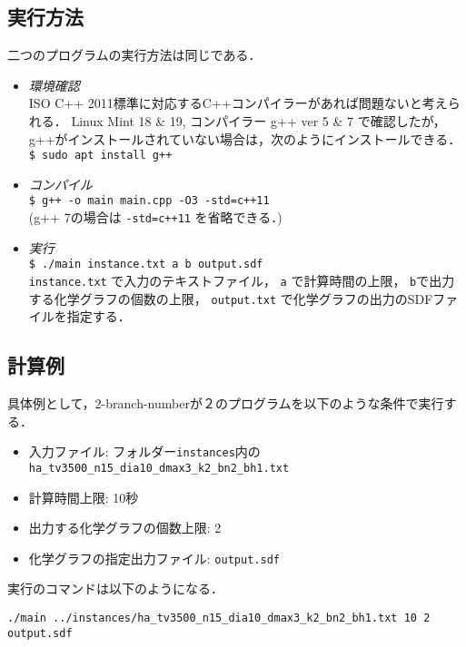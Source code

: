 \documentclass[11pt,titlepage,dvipdfmx,twoside]{jarticle}
\begin{document}
\subsection{実行方法}
\label{sec:compile}
二つのプログラムの実行方法は同じである．
\begin{itemize}
	\item {\em 環境確認}\\
		ISO C++ 2011標準に対応するC++コンパイラーがあれば問題ないと考えられる．
		Linux Mint 18 \& 19, コンパイラー g++ ver 5 \& 7 で確認したが，g++がインストールされていない場合は，次のようにインストールできる．\\
		\verb|$ sudo apt install g++|
	\item {\em コンパイル}\\
		\verb|$ g++ -o main main.cpp -O3 -std=c++11|\\
		(g++ 7の場合は \verb|-std=c++11| を省略できる．)
	\item {\em 実行}\\
		\verb|$ ./main instance.txt a b output.sdf|\\
		\verb|instance.txt| で入力のテキストファイル，
		\verb|a| で計算時間の上限，
		\verb|b|で出力する化学グラフの個数の上限，
	\verb|output.txt| で化学グラフの出力のSDFファイルを指定する．
\end{itemize}


\subsection{計算例}
\label{sec:instance}

具体例として，2-branch-numberが２のプログラムを以下のような条件で実行する．

\begin{itemize}
\item 入力ファイル: フォルダー{\tt instances}内の{\tt ha\_tv3500\_n15\_dia10\_dmax3\_k2\_bn2\_bh1.txt}
\item 計算時間上限: 10秒
\item 出力する化学グラフの個数上限: 2
\item 化学グラフの指定出力ファイル: {\tt output.sdf}
\end{itemize}

実行のコマンドは以下のようになる．

\bigskip

{\tt ./main ../instances/ha\_tv3500\_n15\_dia10\_dmax3\_k2\_bn2\_bh1.txt 10 2 output.sdf}

\bigskip
\end{document}
